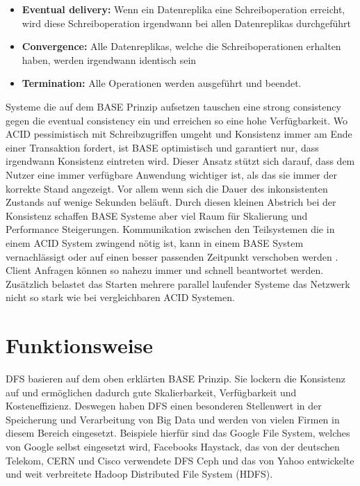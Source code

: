 \documentclass[12pt,oneside,a4paper,parskip]{scrbook}
\begin{document}
\begin{itemize}
  \item \textbf{Eventual delivery:} Wenn ein Datenreplika eine Schreiboperation erreicht, wird diese Schreiboperation irgendwann bei allen Datenreplikas durchgeführt
  \item \textbf{Convergence:} Alle Datenreplikas, welche die Schreiboperationen erhalten haben, werden irgendwann identisch sein
  \item \textbf{Termination:} Alle Operationen werden ausgeführt und beendet.
\end{itemize}
Systeme die auf dem BASE Prinzip aufsetzen tauschen eine strong consistency gegen die eventual consistency ein und erreichen so eine hohe Verfügbarkeit. Wo ACID pessimistisch mit Schreibzugriffen umgeht und Konsistenz immer am Ende einer Transaktion fordert, ist BASE optimistisch und garantiert nur, dass irgendwann Konsistenz eintreten wird. Dieser Ansatz stützt sich darauf, dass dem Nutzer eine immer verfügbare Anwendung wichtiger ist, als das sie immer der korrekte Stand angezeigt. Vor allem wenn sich die Dauer des inkonsistenten Zustands auf wenige Sekunden beläuft. Durch diesen kleinen Abstrich bei der Konsistenz schaffen BASE Systeme aber viel Raum für Skalierung und Performance Steigerungen. Kommunikation zwischen den Teilsystemen die in einem ACID System zwingend nötig ist, kann in einem BASE System vernachlässigt oder auf einen besser passenden Zeitpunkt verschoben werden \cite{clusterBASE}. Client Anfragen können so nahezu immer und schnell beantwortet werden. Zusätzlich belastet das Starten mehrere parallel laufender Systeme das Netzwerk nicht so stark wie bei vergleichbaren ACID Systemen.

\section{Funktionsweise}
DFS basieren auf dem oben erklärten BASE Prinzip. Sie lockern die Konsistenz auf und ermöglichen dadurch gute Skalierbarkeit, Verfügbarkeit und Kosteneffizienz. Deswegen haben DFS einen besonderen Stellenwert in der Speicherung und Verarbeitung von Big Data und werden von vielen Firmen in diesem Bereich eingesetzt. Beispiele hierfür sind das Google File System, welches von Google selbst eingesetzt wird, Facebooks Haystack, das von der deutschen Telekom, CERN und Cisco verwendete DFS Ceph \cite{ceph} und das von Yahoo entwickelte und weit verbreitete Hadoop Distributed File System (HDFS).
\end{document}
